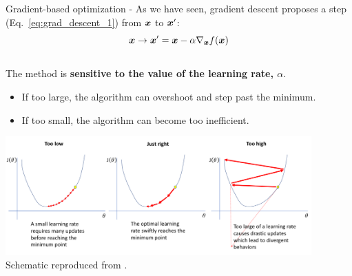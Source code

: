 \begin{frame}[t,allowframebreaks]{Gradient-based optimization -}
    \vspace{-0.5cm}
    As we have seen, 
    \gls{gradient descent} 
    proposes a step (Eq.~\ref{eq:grad_descent_1}) 
    from $\boldsymbol{x}$ to $\boldsymbol{x}^\prime$:\\
    \vspace{-0.2cm}
    \begin{equation*}
        \boldsymbol{x} \rightarrow \boldsymbol{x}^\prime = 
            \boldsymbol{x} - \alpha \nabla_{\boldsymbol{x}} f(\boldsymbol{x})
    \end{equation*}\\
    \vspace{-0.1cm}
    The method is {\bf sensitive to the value of the 
    \gls{learning rate}, $\alpha$}.\\
    \begin{itemize}
        \small
        \item 
        If too large, the algorithm can 
        overshoot and step past the minimum.
        \item 
        If too small, the algorithm can become 
        too inefficient.
    \end{itemize}
    \begin{center}
        \includegraphics[width=0.88\textwidth]
            {./images/grad_descent/atu22_learning_rate_1.png}\\
        {\tiny 
            \color{col:attribution} 
            Schematic reproduced from \cite{Medium:GradDescent}.\\
        }
    \end{center}                    

    \framebreak



\end{frame}
